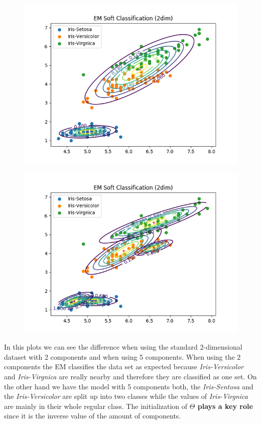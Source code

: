 \documentclass[a4paper]{article}
\begin{document}
\begin{enumerate}
\begin{figure}[htp]
\centering
\begin{minipage}{0.4\textwidth}
  \includegraphics[scale=0.5]{plots/gauss_sc1_c2.png}
  \label{fig:16}
\end{minipage}
\hfill
\begin{minipage}{0.4\textwidth}
  \includegraphics[scale=0.5]{plots/gauss_sc1_c5.png}
  \label{fig:17}
\end{minipage}
\end{figure}

In this plots we can see the difference when using the standard 2-dimensional dataset with 2 components and when using 5 components.
When using the 2 components the EM classifies the data set as expected because \textit{Iris-Versicolor} and \textit{Iris-Virgnica} are really nearby and therefore they are classified as one set. On the other hand we have the model with 5 components both, the \textit{Iris-Sentosa} and the \textit{Iris-Versicolor} are split up into two classes while the values of \textit{Iris-Virgnica} are mainly in their whole regular class. The initialization of \textbf{$\Theta$ plays a key role} since it is the inverse value of the amount of components. \\


\end{enumerate}
\end{document}
